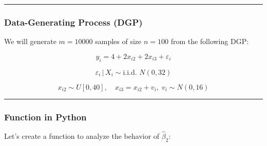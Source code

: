 \documentclass[
  letterpaper,
  DIV=11,
  numbers=noendperiod]{scrartcl}
\begin{document}
\begin{center}\rule{0.5\linewidth}{0.5pt}\end{center}

\subsubsection{Data-Generating Process
(DGP)}\label{data-generating-process-dgp}

We will generate \(m=10000\) samples of size \(n=100\) from the
following DGP:

\begin{tcolorbox}[enhanced jigsaw, rightrule=.15mm, leftrule=.75mm, colback=white, left=2mm, colframe=quarto-callout-tip-color-frame, coltitle=black, opacitybacktitle=0.6, bottomrule=.15mm, toprule=.15mm, colbacktitle=quarto-callout-tip-color!10!white, breakable, titlerule=0mm, opacityback=0, toptitle=1mm, bottomtitle=1mm, title={DGP}, arc=.35mm]

\[
y_i = 4 + 2x_{i2} + 2x_{i3} + \varepsilon_i 
\]

\[\varepsilon_i \,|\, X_i \sim \text{i.i.d. } N(0,32)\]

\[
x_{i2} \sim U[0,40], \quad
x_{i3} = x_{i2} + v_i, \; v_i \sim N(0, 16)
\]

\end{tcolorbox}

\begin{center}\rule{0.5\linewidth}{0.5pt}\end{center}

\subsubsection{Function in Python}\label{function-in-python}

Let's create a function to analyze the behavior of \(\hat{\beta}_2\):
\end{document}
